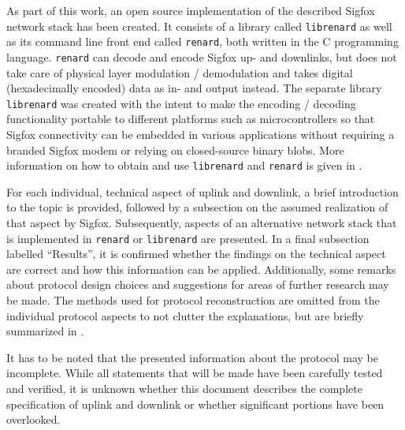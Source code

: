 As part of this work, an open source implementation of the described Sigfox network stack has been created.
It consists of a library called \texttt{librenard} as well as its command line front end called \texttt{renard}, both written in the C programming language.
\texttt{renard} can decode and encode Sigfox up- and downlinks, but does not take care of physical layer modulation / demodulation and takes digital (hexadecimally encoded) data as in- and output instead.
The separate library \texttt{librenard} was created with the intent to make the encoding / decoding functionality portable to different platforms such as microcontrollers so that Sigfox connectivity can be embedded in various applications without requiring a branded Sigfox modem or relying on closed-source binary blobs.
More information on how to obtain and use \texttt{librenard} and \texttt{renard} is given in .

For each individual, technical aspect of uplink and downlink, a brief introduction to the topic is provided, followed by a subsection on the assumed realization of that aspect by Sigfox.
Subsequently, aspects of an alternative network stack that is implemented in \texttt{renard} or \texttt{librenard} are presented.
In a final subsection labelled ``Results'', it is confirmed whether the findings on the technical aspect are correct and how this information can be applied.
Additionally, some remarks about protocol design choices and suggestions for areas of further research may be made.
The methods used for protocol reconstruction are omitted from the individual protocol aspects to not clutter the explanations, but are briefly summarized in .

It has to be noted that the presented information about the protocol may be incomplete.
While all statements that will be made have been carefully tested and verified, it is unknown whether this document describes the complete specification of uplink and downlink or whether significant portions have been overlooked.

